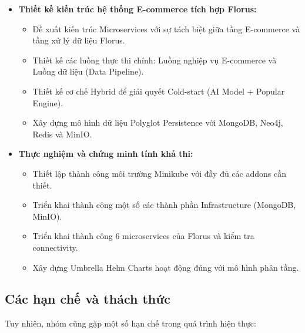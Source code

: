 \begin{itemize}
    \item \textbf{Thiết kế kiến trúc hệ thống E-commerce tích hợp Florus:}
    \begin{itemize}
        \item Đề xuất kiến trúc Microservices với sự tách biệt giữa tầng E-commerce và tầng xử lý dữ liệu Florus.
        \item Thiết kế các luồng thực thi chính: Luồng nghiệp vụ E-commerce và Luồng dữ liệu (Data Pipeline).
        \item Thiết kế cơ chế Hybrid để giải quyết Cold-start (AI Model + Popular Engine).
        \item Xây dựng mô hình dữ liệu Polyglot Persistence với MongoDB, Neo4j, Redis và MinIO.
    \end{itemize}

    \item \textbf{Thực nghiệm và chứng minh tính khả thi:}
    \begin{itemize}
        \item Thiết lập thành công môi trường Minikube với đầy đủ các addons cần thiết.
        \item Triển khai thành công một số các thành phần Infrastructure (MongoDB, MinIO).
        \item Triển khai thành công 6 microservices của Florus và kiểm tra connectivity.
        \item Xây dựng Umbrella Helm Charts hoạt động đúng với mô hình phân tầng.
    \end{itemize}
\end{itemize}

\subsection{Các hạn chế và thách thức}

Tuy nhiên, nhóm cũng gặp một số hạn chế trong quá trình hiện thực:

